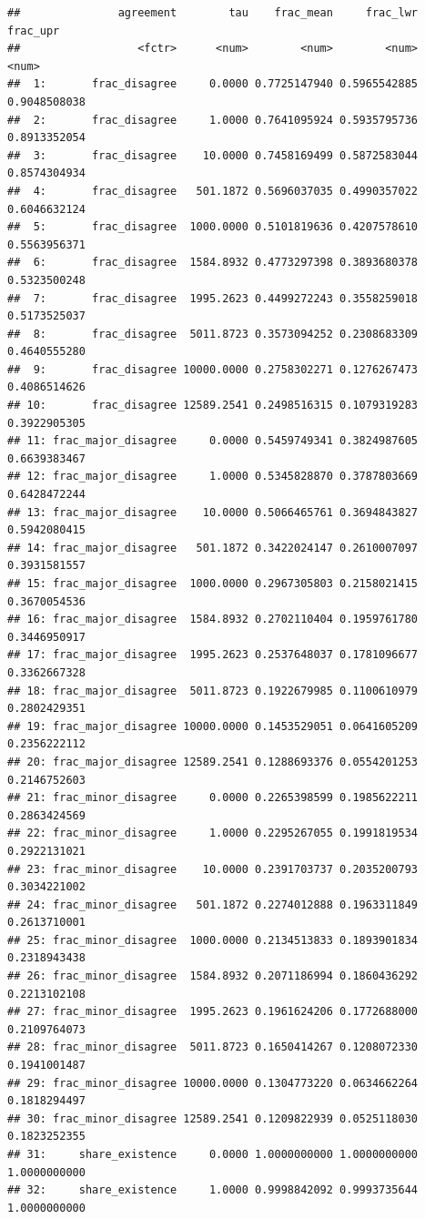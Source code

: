 \documentclass[
  11pt,
]{article}
\begin{document}
\begin{verbatim}
##               agreement        tau    frac_mean     frac_lwr     frac_upr
##                  <fctr>      <num>        <num>        <num>        <num>
##  1:       frac_disagree     0.0000 0.7725147940 0.5965542885 0.9048508038
##  2:       frac_disagree     1.0000 0.7641095924 0.5935795736 0.8913352054
##  3:       frac_disagree    10.0000 0.7458169499 0.5872583044 0.8574304934
##  4:       frac_disagree   501.1872 0.5696037035 0.4990357022 0.6046632124
##  5:       frac_disagree  1000.0000 0.5101819636 0.4207578610 0.5563956371
##  6:       frac_disagree  1584.8932 0.4773297398 0.3893680378 0.5323500248
##  7:       frac_disagree  1995.2623 0.4499272243 0.3558259018 0.5173525037
##  8:       frac_disagree  5011.8723 0.3573094252 0.2308683309 0.4640555280
##  9:       frac_disagree 10000.0000 0.2758302271 0.1276267473 0.4086514626
## 10:       frac_disagree 12589.2541 0.2498516315 0.1079319283 0.3922905305
## 11: frac_major_disagree     0.0000 0.5459749341 0.3824987605 0.6639383467
## 12: frac_major_disagree     1.0000 0.5345828870 0.3787803669 0.6428472244
## 13: frac_major_disagree    10.0000 0.5066465761 0.3694843827 0.5942080415
## 14: frac_major_disagree   501.1872 0.3422024147 0.2610007097 0.3931581557
## 15: frac_major_disagree  1000.0000 0.2967305803 0.2158021415 0.3670054536
## 16: frac_major_disagree  1584.8932 0.2702110404 0.1959761780 0.3446950917
## 17: frac_major_disagree  1995.2623 0.2537648037 0.1781096677 0.3362667328
## 18: frac_major_disagree  5011.8723 0.1922679985 0.1100610979 0.2802429351
## 19: frac_major_disagree 10000.0000 0.1453529051 0.0641605209 0.2356222112
## 20: frac_major_disagree 12589.2541 0.1288693376 0.0554201253 0.2146752603
## 21: frac_minor_disagree     0.0000 0.2265398599 0.1985622211 0.2863424569
## 22: frac_minor_disagree     1.0000 0.2295267055 0.1991819534 0.2922131021
## 23: frac_minor_disagree    10.0000 0.2391703737 0.2035200793 0.3034221002
## 24: frac_minor_disagree   501.1872 0.2274012888 0.1963311849 0.2613710001
## 25: frac_minor_disagree  1000.0000 0.2134513833 0.1893901834 0.2318943438
## 26: frac_minor_disagree  1584.8932 0.2071186994 0.1860436292 0.2213102108
## 27: frac_minor_disagree  1995.2623 0.1961624206 0.1772688000 0.2109764073
## 28: frac_minor_disagree  5011.8723 0.1650414267 0.1208072330 0.1941001487
## 29: frac_minor_disagree 10000.0000 0.1304773220 0.0634662264 0.1818294497
## 30: frac_minor_disagree 12589.2541 0.1209822939 0.0525118030 0.1823252355
## 31:     share_existence     0.0000 1.0000000000 1.0000000000 1.0000000000
## 32:     share_existence     1.0000 0.9998842092 0.9993735644 1.0000000000

\end{verbatim}
\end{document}
